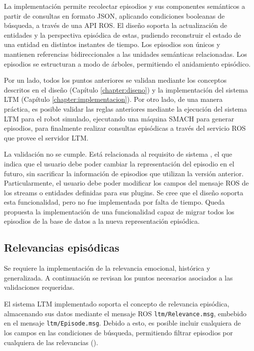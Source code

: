 La implementación permite recolectar episodios y sus componentes semánticos a partir de consultas en formato JSON, aplicando condiciones booleanas de búsqueda, a través de una API ROS. El diseño soporta la actualización de entidades y la perspectiva episódica de estas, pudiendo reconstruir el estado de una entidad en distintos instantes de tiempo. Los episodios son únicos y mantienen referencias bidireccionales a las unidades semánticas relacionadas. Los episodios se estructuran a modo de árboles, permitiendo el anidamiento episódico.

Por un lado, todos los puntos anteriores se validan mediante los conceptos descritos en el diseño (Capítulo \ref{chapter:diseno}) y la implementación del sistema LTM (Capítulo \ref{chapter:implementacion}). Por otro lado, de una manera práctica, es posible validar las reglas anteriores mediante la ejecución del sistema LTM para el robot simulado, ejecutando una máquina SMACH para generar episodios, para finalmente realizar consultas episódicas a través del servicio ROS que provee el servidor LTM.

La validación  no se cumple. Está relacionada al requisito de sistema , el que indica que el usuario debe poder cambiar la representación del episodio en el futuro, sin sacrificar la información de episodios que utilizan la versión anterior. Particularmente, el usuario debe poder modificar los campos del mensaje ROS de los streams o entidades definidas para sus plugins. Se cree que el diseño soporta esta funcionalidad, pero no fue implementada por falta de tiempo. Queda propuesta la implementación de una funcionalidad capaz de migrar todos los episodios de la base de datos a la nueva representación episódica.

\subsection{Relevancias episódicas}

Se requiere la implementación de la relevancia emocional, histórica y generalizada. A continuación se revisan los puntos necesarios asociados a las validaciones requeridas.

El sistema LTM implementado soporta el concepto de relevancia episódica, almacenando sus datos mediante el mensaje ROS \texttt{ltm/Relevance.msg}, embebido en el mensaje \texttt{ltm/Episode.msg}. Debido a esto, es posible incluir cualquiera de los campos en las condiciones de búsqueda, permitiendo filtrar episodios por cualquiera de las relevancias ().

